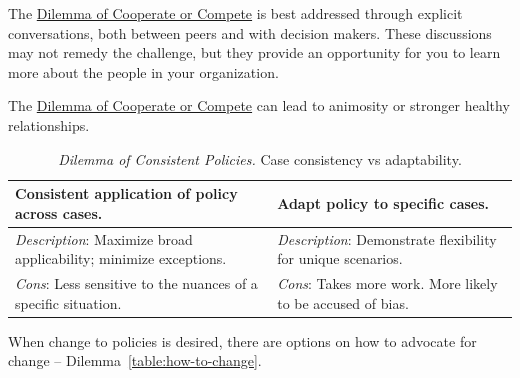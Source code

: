 The \hyperref[table:cooperate-vs-compete]{Dilemma of Cooperate or Compete} is best addressed through explicit conversations, both between peers and with decision makers. These discussions may not remedy the challenge, but they provide an opportunity for you to learn more about the people in your organization.

The \hyperref[table:cooperate-vs-compete]{Dilemma of Cooperate or Compete} can lead to animosity or stronger healthy relationships. 



\begin{center}
\begin{table}[H] %
\begin{tabular}{ | m{\dilemmatablewidth}| m{\dilemmatablewidth} | }
  \hline
  \textbf{Consistent application of policy across cases.} &
  \textbf{Adapt policy to specific cases.} \\
  \hline
  \textit{Description}: Maximize broad applicability; minimize exceptions. &
  \textit{Description}: Demonstrate flexibility for unique scenarios. \\  
  \hline
  \textit{Cons}: Less sensitive to the nuances of a specific situation. & 
  \textit{Cons}: Takes more work. More likely to be accused of bias. \\
  \hline
\end{tabular}
\caption{
\textit{Dilemma of Consistent Policies.}
Case consistency vs adaptability.
}
\label{table:policy-consistency-across-cases}
\end{table}
\end{center}

When change to policies is desired, there are options on how to advocate for change -- Dilemma~\ref{table:how-to-change}.



